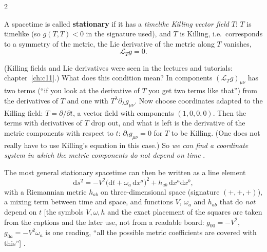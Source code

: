 \begin{paracol}{2}
\begin{definition}\label{def:c16-stat}
A spacetime is called \textbf{stationary} if it has a \emph{timelike Killing vector field} $T$: $T$ is timelike (so $g(T,T)<0$ in the signature used), and $T$ is Killing, i.e.\ corresponds to a symmetry of the metric, the Lie derivative of the metric along $T$ vanishes,
\[
  \mathcal L_Tg=0.
\]
\end{definition}
(Killing fields and Lie derivatives were seen in the lectures and tutorials: chapter~\ref{ch:c11}.) What does this condition mean? In components $(\mathcal L_Tg)_{\mu\nu}$ has two terms (``if you look at the derivative of $T$ you get two terms like that'') from the derivatives of $T$ and one with $T^\lambda\partial_\lambda g_{\mu\nu}$. Now choose coordinates adapted to the Killing field: $T=\partial/\partial t$, a vector field with components $(1,0,0,0)$. Then the terms with derivatives of $T$ drop out, and what is left is the derivative of the metric components with respect to $t$: $\partial_tg_{\mu\nu}=0$ for $T$ to be Killing. (One does not really have to use Killing's equation in this case.) So \emph{we can find a coordinate system in which the metric components do not depend on time} .

The most general stationary spacetime can then be written as a line element
\begin{equation}\label{eq:c16-stat}
  \mathrm ds^2=-V^2\bigl(\mathrm dt+\omega_a\,\mathrm dx^a\bigr)^2+h_{ab}\,\mathrm dx^a\mathrm dx^b,
\end{equation}
with a Riemannian metric $h_{ab}$ on three-dimensional space (signature $(+,+,+)$), a mixing term between time and space, and functions $V$, $\omega_a$ and $h_{ab}$ that do \emph{not} depend on $t$ [the symbols $V,\omega,h$ and the exact placement of the squares are taken from the captions and the later use, not from a readable board: $g_{00}=-V^2$, $g_{0a}=-V^2\omega_a$ is one reading, ``all the possible metric coefficients are covered with this''] .


\end{paracol}
